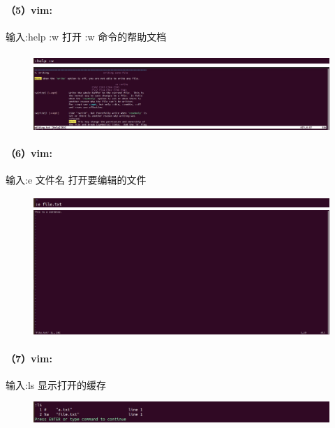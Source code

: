 \documentclass[a4paper, 12pt]{article}
\begin{document}
	\paragraph{（5）vim:}
	输入:help :w 打开 :w 命令的帮助文档	
	
	\begin{figure}[H]
		\centering
		\includegraphics[width=1\textwidth]{023.jpg}
		\includegraphics[width=1\textwidth]{024.jpg}
	\end{figure}
	
	\paragraph{（6）vim:}	
	输入:e {文件名} 打开要编辑的文件
	
	\begin{figure}[H]
		\centering
		\includegraphics[width=1\textwidth]{025.jpg}
		\includegraphics[width=1\textwidth]{026.jpg}
	\end{figure}
	
	\paragraph{（7）vim:}
	输入:ls 显示打开的缓存
	
	\begin{figure}[H]
		\centering
		\includegraphics[width=1\textwidth]{027.jpg}
	\end{figure}
	
\end{document}
